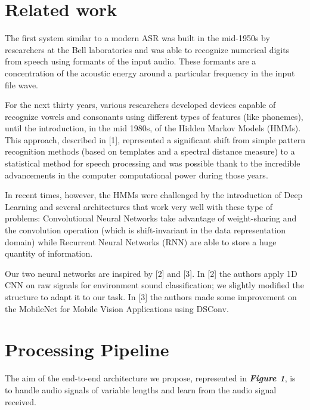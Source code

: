\documentclass[conference]{IEEEtran}
\begin{document}

\section{Related work}
The first system similar to a modern ASR was built in the mid-1950s by researchers at the Bell laboratories and was able to recognize numerical digits from speech using formants of the input audio. These formants are a concentration of the acoustic energy around a particular frequency in the input file wave. 

For the next thirty years, various researchers developed devices capable of recognize vowels and consonants using different types of features (like phonemes), until the introduction, in the mid 1980s, of the Hidden Markov Models (HMMs). This approach, described in [1], represented a significant shift from simple pattern recognition methods (based on templates and a spectral distance measure) to a statistical method for speech processing and was possible thank to the incredible advancements in the computer computational power during those years.

In recent times, however, the HMMs were challenged by the introduction of Deep Learning and several architectures that work very well with these type of problems: Convolutional Neural Networks take advantage of weight-sharing and the convolution operation (which is shift-invariant in the data representation domain) while Recurrent Neural Networks (RNN) are able to store a huge quantity of information.

Our two neural networks are inspired by [2] and [3]. In [2] the authors apply 1D CNN on raw signals for environment sound classification; we slightly modified the structure to adapt it to our task. In [3] the authors made some improvement on the MobileNet for Mobile Vision Applications using DSConv. 
\hfill
\section{Processing Pipeline}
The aim of the end-to-end architecture we propose, represented in \textbf{\textit{Figure 1}}, is to handle audio signals of variable lengths and learn from the audio signal received.
\end{document}
